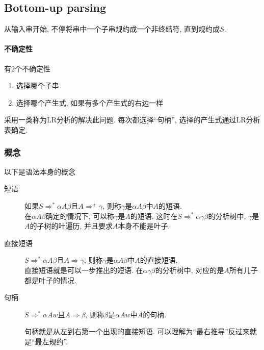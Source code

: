 \documentclass{ctexart}
\begin{document}
\subsection{Bottom-up parsing}
    从输入串开始, 不停将串中一个子串规约成一个非终结符, 直到规约成$S$.
\paragraph{不确定性} 有2个不确定性
    \begin{enumerate}
        \item 选择哪个子串
        \item 选择哪个产生式, 如果有多个产生式的右边一样
    \end{enumerate}
    采用一类称为LR分析的解决此问题.
    每次都选择``句柄'', 选择的产生式通过LR分析表确定.
\subsubsection{概念}
    以下是语法本身的概念
    \begin{description}
        \item[短语] 如果$S\Rightarrow^* \alpha A \beta$且$A \Rightarrow^+ \gamma$,
                则称$\gamma$是$\alpha A \beta$中$A$的短语.\\
                在$\alpha A \beta$确定的情况下, 可以称$\gamma$是$A$的短语.
                这时在$S \Rightarrow^* \alpha \gamma \beta$的分析树中,
                $\gamma$是$A$的子树的叶遍历, 并且要求$A$本身不能是叶子.
        \item[直接短语] $S\Rightarrow^* \alpha A \beta$且$A \Rightarrow \gamma$,
                则称$\gamma$是$\alpha A \beta$中$A$的直接短语.\\
                直接短语就是可以一步推出的短语.
                在$\alpha \gamma \beta$的分析树中, 对应的是$A$所有儿子都是叶子的情况.
        \item[句柄] $S \Rightarrow^* \alpha A w$且$A \Rightarrow \beta$,
                则称$\beta$是$\alpha A w$中$A$的句柄.\par
                句柄就是从左到右第一个出现的直接短语.
                可以理解为``最右推导''反过来就是``最左规约''.
    \end{description}
\end{document}
